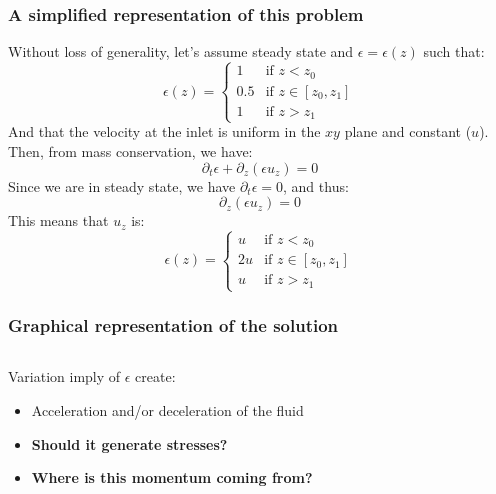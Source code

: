 \documentclass[c,11pt,xcolor=dvipsnames, aspectratio=169]{beamer}
\begin{document}
\begin{frame}
	\frametitle{\textbf{A simplified representation of this problem}}
	
Without loss of generality, let's assume steady state and $\epsilon=\epsilon(z)$ such that:
\[
\epsilon(z) = \begin{cases}
	1 & \text{if } z < z_0 \\
	0.5 & \text{if } z \in[z_0, z_1] \\
	1 & \text{if } z > z_1
\end{cases}
\]
And that the velocity at the inlet is uniform in the $xy$ plane and constant ($u$). Then, from mass conservation, we have:
\[
\partial_t \epsilon + \partial_z (\epsilon u_z) = 0
\]
Since we are in steady state, we have $\partial_t \epsilon = 0$, and thus:
\[
\partial_z (\epsilon u_z) = 0
\]
This means that $u_z$ is:
\[
	\epsilon(z) = \begin{cases}
		u & \text{if } z < z_0 \\
		2u & \text{if } z \in[z_0, z_1] \\
		u & \text{if } z > z_1
	\end{cases}
\]

\end{frame}

\begin{frame}
	\frametitle{\textbf{Graphical representation of the solution}}

		\begin{columns}[c]
			\begin{column}{0.5\textwidth}
				Variation imply of $\epsilon$ create:
				\begin{itemize}
					\item Acceleration and/or deceleration of the fluid
					\item \textbf{Should it generate stresses?}
					\item \textbf{Where is this momentum coming from?}
				\end{itemize}
				\end{column}
			\begin{column}{0.5\textwidth}
				\vspace*{-\baselineskip}
				\begin{center}
				\end{center}
			\end{column}
		\end{columns}
\end{frame}
\end{document}
